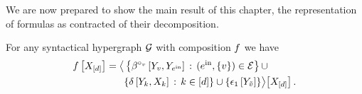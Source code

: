 We are now prepared to show the main result of this chapter, the representation of formulas as contracted \basisEncoding{} of their decomposition.

\begin{theorem}
    \label{the:formulaDecompositionRep}
    For any syntactical hypergraph $\mathcal{G}$ with composition $f$ we have
    \begin{align*}
        f\left[X_{[d]}\right]
        = \big\langle 
            &\left\{
            \beta^{\circ_{v}}\left[Y_{v},Y_{e^{\mathrm{in}}}\right] \,:\, (e^{\mathrm{in}},\{v\})\in\mathcal{E}
            \right\} \cup \\
            & \{\delta\left[Y_{k},X_{k}\right] \,:\, k\in[d]\}
            \cup \{\epsilon_{1}\left[Y_{\tilde{v}}\right]\}
         \big\rangle \big[ X_{[d]} \big] \, .
    \end{align*}
\end{theorem}
